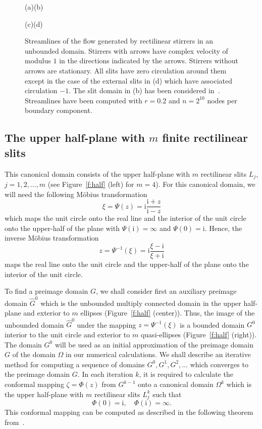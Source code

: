 \documentclass[11pt,a4paper]{article}
\renewcommand{\i}{\mathrm{i}}
\renewcommand{\i}{\mathrm{i}}
\begin{document}
\begin{figure}[ht] %
{\quad(a)\hfill\qquad(b)\hfill}

\centerline{
\hfill
{}
}
{\quad(c)\hfill\qquad\qquad(d)\hfill}

\centerline{
\hfill
{}
}
\caption{Streamlines of the flow generated by rectilinear stirrers in an unbounded domain. Stirrers with arrows have complex velocity of modulus $1$ in the directions indicated by the arrows. Stirrers without arrows are stationary. All slits have zero circulation around them except in the case of  the external slits in (d) which have associated circulation $-1$. The slit domain in (b) has been considered in~\cite[Fig.~6]{cro-str}. Streamlines have been computed with $r=0.2$ and $n=2^{10}$ nodes per boundary component.} 
\label{f:Stirrers-str}
\end{figure}

\subsection{The upper half-plane with $m$ finite rectilinear slits}
\label{sc:half}

This canonical domain consists of the upper half-plane with $m$ rectilinear slits $L_j$, $j=1,2,\ldots,m$ (see Figure~\ref{f:half} (left) for $m=4$). 
For this canonical domain, we will need the following M\"obius transformation  
\[
\xi=\Psi(z)=\i\frac{\i+z}{\i-z}
\]
which maps the unit circle onto the real line and the interior of the unit circle onto the upper-half of the plane with $\Psi(\i)=\infty$ and $\Psi(0)=\i$. Hence, the inverse M\"obius transformation 
\[
z=\Psi^{-1}(\xi)=\i\frac{\xi-\i}{\xi+\i}
\]
maps the real line onto the unit circle and the upper-half of the plane onto the interior of the unit circle. 

To find a preimage domain $G$, we shall consider first an auxiliary preimage domain $\hat G^0$ which is the unbounded multiply connected domain in the upper half-plane and exterior to $m$ ellipses (Figure~\ref{f:half} (center)). 
Thus, the image of the unbounded domain $\hat G^0$ under the mapping $z=\Psi^{-1}(\xi)$ is a bounded domain $G^0$ interior to the unit circle and exterior to $m$ quasi-ellipses (Figure~\ref{f:half} (right)). The domain $G^0$ will be used as an initial approximation of the preimage domain $G$ of the domain $\Omega$ in our numerical calculations. We shall describe an iterative method for computing a sequence of domains $G^0, G^1, G^2,\ldots$ which converges to the preimage domain $G$. In each iteration $k$, it is required to calculate the conformal mapping $\zeta=\Phi(z)$ from $G^{k-1}$ onto a canonical domain $\Omega^k$ which is the upper half-plane with $m$ rectilinear slits $L^k_j$ such that 
\[
\Phi(0)=\i, \quad \Phi(\i)=\infty.
\]
This conformal mapping can be computed as described in the following theorem from~\cite{Nas-JMAA13}.
\end{document}

